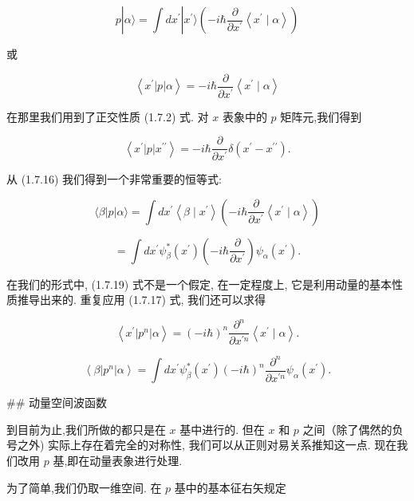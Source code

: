 \documentclass[lang=cn,newtx,10pt,scheme=chinese,thmcnt=section]{elegantbook}
\begin{document}
$$
p\left| {\alpha \rangle = \int d{x}^{\prime }}\right| {x}^{\prime }\rangle \left( {-i\hbar \frac{\partial }{\partial {x}^{\prime }}\left\langle {{x}^{\prime } \mid \alpha }\right\rangle }\right) \tag{1.7.16}
$$

或

$$
\left\langle {{x}^{\prime }\left| p\right| \alpha }\right\rangle = - i\hbar \frac{\partial }{\partial {x}^{\prime }}\left\langle {{x}^{\prime } \mid \alpha }\right\rangle \tag{1.7.17}
$$

在那里我们用到了正交性质 (1.7.2) 式. 对 $x$ 表象中的 $p$ 矩阵元,我们得到

$$
\left\langle {{x}^{\prime }\left| p\right| {x}^{\prime \prime }}\right\rangle = - i\hbar \frac{\partial }{\partial {x}^{\prime }}\delta \left( {{x}^{\prime } - {x}^{\prime \prime }}\right) . \tag{1.7.18}
$$

从 (1.7.16) 我们得到一个非常重要的恒等式:

$$
\langle \beta \left| p\right| \alpha \rangle = \int d{x}^{\prime }\left\langle {\beta \mid {x}^{\prime }}\right\rangle \left( {-i\hbar \frac{\partial }{\partial {x}^{\prime }}\left\langle {{x}^{\prime } \mid \alpha }\right\rangle }\right) \tag{1.7.19}
$$

$$
= \int d{x}^{\prime }{\psi }_{\beta }^{ * }\left( {x}^{\prime }\right) \left( {-i\hbar \frac{\partial }{\partial {x}^{\prime }}}\right) {\psi }_{\alpha }\left( {x}^{\prime }\right) .
$$

在我们的形式中, (1.7.19) 式不是一个假定, 在一定程度上, 它是利用动量的基本性质推导出来的. 重复应用 (1.7.17) 式, 我们还可以求得

$$
\left\langle {{x}^{\prime }\left| {p}^{n}\right| \alpha }\right\rangle = {\left( -i\hbar \right) }^{n}\frac{{\partial }^{n}}{\partial {x}^{\prime n}}\left\langle {{x}^{\prime } \mid \alpha }\right\rangle . \tag{1. 7.20}
$$

$$
\left\langle {\beta \left| {p}^{n}\right| \alpha }\right\rangle = \int d{x}^{\prime }{\psi }_{\beta }^{ * }\left( {x}^{\prime }\right) {\left( -i\hbar \right) }^{n}\frac{{\partial }^{n}}{\partial {x}^{\prime n}}{\psi }_{\alpha }\left( {x}^{\prime }\right) . \tag{1.7.21}
$$

## 动量空间波函数

到目前为止,我们所做的都只是在 $x$ 基中进行的. 但在 $x$ 和 $p$ 之间（除了偶然的负号之外) 实际上存在着完全的对称性, 我们可以从正则对易关系推知这一点. 现在我们改用 $p$ 基,即在动量表象进行处理.

为了简单,我们仍取一维空间. 在 $p$ 基中的基本征右矢规定
\end{document}
